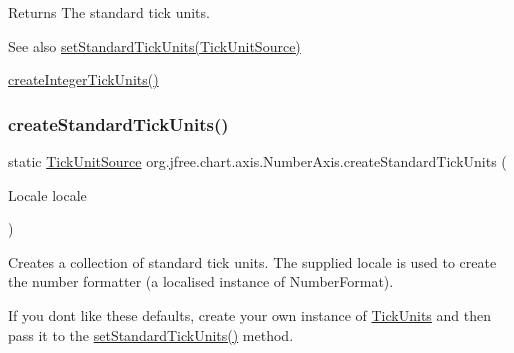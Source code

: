 \begin{DoxyReturn}{Returns}
The standard tick units.
\end{DoxyReturn}
\begin{DoxySeeAlso}{See also}
\mbox{\hyperlink{classorg_1_1jfree_1_1chart_1_1axis_1_1_value_axis_ac84e1ffa28cdea7b355306ae472d21a2}{set\+Standard\+Tick\+Units(\+Tick\+Unit\+Source)}} 

\mbox{\hyperlink{classorg_1_1jfree_1_1chart_1_1axis_1_1_number_axis_adc561730bb342bdaf2c59d8bd5897718}{create\+Integer\+Tick\+Units()}} 
\end{DoxySeeAlso}
\mbox{\label{classorg_1_1jfree_1_1chart_1_1axis_1_1_number_axis_aa8fced0acbcb92ac7cc67b394ee9736f}} 
\subsubsection{\texorpdfstring{create\+Standard\+Tick\+Units()}{createStandardTickUnits()}\hspace{0.1cm}{\footnotesize\ttfamily [2/2]}}
{\footnotesize\ttfamily static \mbox{\hyperlink{interfaceorg_1_1jfree_1_1chart_1_1axis_1_1_tick_unit_source}{Tick\+Unit\+Source}} org.\+jfree.\+chart.\+axis.\+Number\+Axis.\+create\+Standard\+Tick\+Units (\begin{DoxyParamCaption}\item[{Locale}]{locale }\end{DoxyParamCaption})\hspace{0.3cm}{\ttfamily [static]}}

Creates a collection of standard tick units. The supplied locale is used to create the number formatter (a localised instance of {\ttfamily Number\+Format}). 

If you don\textquotesingle{}t like these defaults, create your own instance of \mbox{\hyperlink{classorg_1_1jfree_1_1chart_1_1axis_1_1_tick_units}{Tick\+Units}} and then pass it to the {\ttfamily \mbox{\hyperlink{classorg_1_1jfree_1_1chart_1_1axis_1_1_value_axis_ac84e1ffa28cdea7b355306ae472d21a2}{set\+Standard\+Tick\+Units()}}} method.


